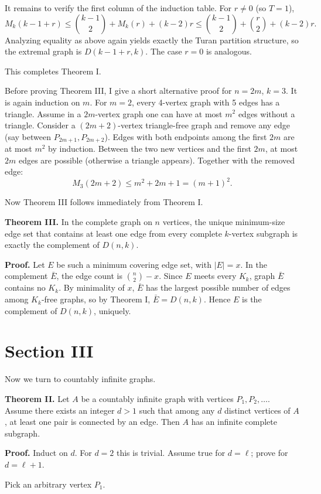 \documentclass[11pt]{article}
\begin{document}
It remains to verify the first column of the induction table. For $r\ne0$ (so $T=1$),
\[
M_k(k-1+r)
\le \binom{k-1}{2}+M_k(r)+(k-2)r
\le \binom{k-1}{2}+\binom{r}{2}+(k-2)r. \tag{4}
\]
Analyzing equality as above again yields exactly the Turan partition structure, so the extremal graph is $D(k-1+r,k)$. The case $r=0$ is analogous.

This completes Theorem I.

Before proving Theorem III, I give a short alternative proof for $n=2m$, $k=3$. It is again induction on $m$. For $m=2$, every 4-vertex graph with 5 edges has a triangle. Assume in a $2m$-vertex graph one can have at most $m^2$ edges without a triangle. Consider a $(2m+2)$-vertex triangle-free graph and remove any edge (say between $P_{2m+1},P_{2m+2}$). Edges with both endpoints among the first $2m$ are at most $m^2$ by induction. Between the two new vertices and the first $2m$, at most $2m$ edges are possible (otherwise a triangle appears). Together with the removed edge:
\[
M_3(2m+2)\le m^2+2m+1=(m+1)^2.
\]

Now Theorem III follows immediately from Theorem I.

\textbf{Theorem III.}
In the complete graph on $n$ vertices, the unique minimum-size edge set that contains at least one edge from every complete $k$-vertex subgraph is exactly the complement of $D(n,k)$.

\textbf{Proof.}
Let $E$ be such a minimum covering edge set, with $|E|=x$. In the complement $\bar E$, the edge count is $\binom{n}{2}-x$. Since $E$ meets every $K_k$, graph $\bar E$ contains no $K_k$. By minimality of $x$, $\bar E$ has the largest possible number of edges among $K_k$-free graphs, so by Theorem I, $\bar E=D(n,k)$. Hence $E$ is the complement of $D(n,k)$, uniquely.

\section*{Section III}
Now we turn to countably infinite graphs.

\textbf{Theorem II.}
Let $A$ be a countably infinite graph with vertices $P_1,P_2,\dots$. Assume there exists an integer $d>1$ such that among any $d$ distinct vertices of $A$, at least one pair is connected by an edge. Then $A$ has an infinite complete subgraph.

\textbf{Proof.}
Induct on $d$. For $d=2$ this is trivial. Assume true for $d=\ell$; prove for $d=\ell+1$.

Pick an arbitrary vertex $P_1$.
\end{document}

